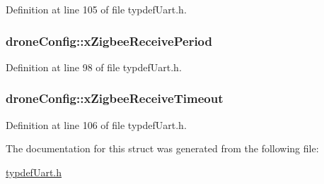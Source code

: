 Definition at line 105 of file typdef\-Uart.\-h.

\hypertarget{structdroneConfig_a8f16de66ac71b922d151ea165b9f4871}{
\subsubsection[{x\-Zigbee\-Receive\-Period}]{ drone\-Config\-::x\-Zigbee\-Receive\-Period}}\label{structdroneConfig_a8f16de66ac71b922d151ea165b9f4871}


Definition at line 98 of file typdef\-Uart.\-h.

\hypertarget{structdroneConfig_a5708172eb0cdfd665ee9ba776168faa1}{
\subsubsection[{x\-Zigbee\-Receive\-Timeout}]{ drone\-Config\-::x\-Zigbee\-Receive\-Timeout}}\label{structdroneConfig_a5708172eb0cdfd665ee9ba776168faa1}


Definition at line 106 of file typdef\-Uart.\-h.



The documentation for this struct was generated from the following file\-:\begin{DoxyCompactItemize}
\item 
\hyperlink{typdefUart_8h}{typdef\-Uart.\-h}\end{DoxyCompactItemize}
